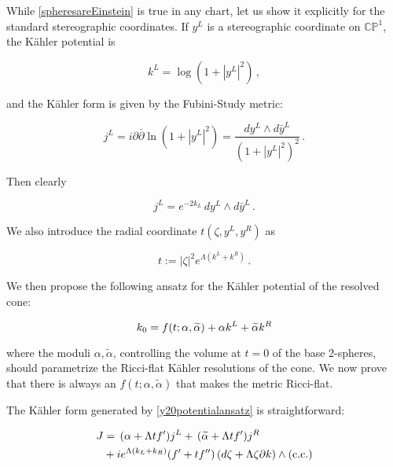 While \eqref{spheresareEinstein} is true in any chart, let us show it explicitly for the standard stereographic coordinates. If $y^L$ is a stereographic coordinate on $\mathbb{CP}^1$, the K\"ahler potential is

\begin{equation}
	k^L = \log(1+|y^L|^2)\,,
	\label{}
\end{equation}

and the K\"ahler form is given by the Fubini-Study metric:

\begin{equation}
	j^L = i \partial \bar\partial \ln(1+ |y^L|^2) = \frac{dy^L \wedge d\bar y^L}{\left(1+|y^L|^2\right)^2}\,.
	\label{}
\end{equation}

Then clearly

\begin{equation}
	j^L = e^{-2 k_L } \,dy^L \wedge d\bar y^L\,.
	\label{}
\end{equation}

We also introduce the radial coordinate $t(\zeta,y^L,y^R)$ as 

\begin{equation}\label{tdef}
	t := |\zeta|^2 e^{\Lambda \left(k^L + k^R\right) }\,.
\end{equation}

We then propose the following ansatz for the K\"ahler potential of the resolved cone:

\begin{equation}
	k_0 = f(t;\alpha,\widetilde{\alpha}) + \alpha k^L + \widetilde{\alpha} k^R \label{y20potentialansatz}
\end{equation}

where the moduli $\alpha,\tilde\alpha$, controlling the volume at $t=0$ of the base 2-spheres, should parametrize the Ricci-flat K\"ahler resolutions of the cone. We now prove that there is always an $f(t;\alpha,\tilde\alpha)$ that makes the metric Ricci-flat.

The K\"ahler form generated by \eqref{y20potentialansatz} is straightforward:

\begin{align}
	\begin{split}\label{y20kahlerformansatz}
	J &= \, (\alpha + \Lambda t f') j^L + \, (\widetilde{\alpha} + \Lambda t f') j^R \\&+ i e^{\Lambda(k_L + k_R)} (f' + t f'') \, (d\zeta + \Lambda \zeta \partial k) \wedge (\mathrm{c.c.})
\end{split}
\end{align}

